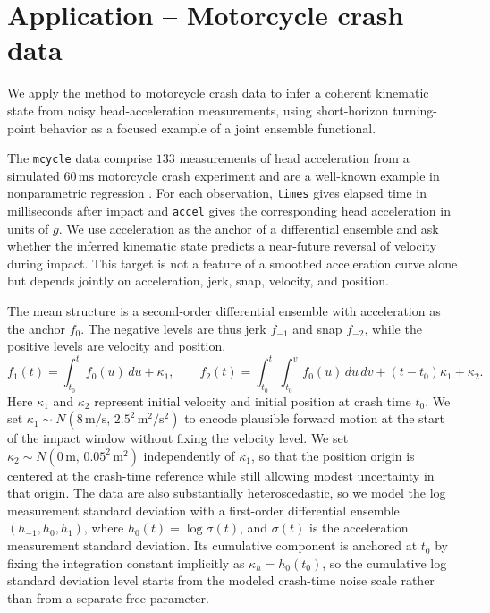 \documentclass[11pt,a4paper]{article}
\theoremstyle{definition}
\theoremstyle{remark}
\begin{document}
\section{Application -- Motorcycle crash data}\label{sec:data}

We apply the method to motorcycle crash data to infer a coherent kinematic state from noisy head-acceleration measurements, using short-horizon turning-point behavior as a focused example of a joint ensemble functional.

The \texttt{mcycle} data comprise $133$ measurements of head acceleration from a simulated $60\,\mathrm{ms}$ motorcycle crash experiment and are a well-known example in nonparametric regression \citep{silverman1985spline,desouza2014switching}. For each observation, \texttt{times} gives elapsed time in milliseconds after impact and \texttt{accel} gives the corresponding head acceleration in units of \(g\). We use acceleration as the anchor of a differential ensemble and ask whether the inferred kinematic state predicts a near-future reversal of velocity during impact. This target is not a feature of a smoothed acceleration curve alone but depends jointly on acceleration, jerk, snap, velocity, and position.

The mean structure is a second-order differential ensemble with acceleration as the anchor \(f_0\). The negative levels are thus jerk \(f_{-1}\) and snap \(f_{-2}\), while the positive levels are velocity and position,
\[
f_1(t)=\int_{t_0}^{t}f_0(u)\,du+\kappa_1,\qquad
f_2(t)=\int_{t_0}^{t}\int_{t_0}^{v}f_0(u)\,du\,dv+(t-t_0)\kappa_1+\kappa_2.
\]
Here \(\kappa_1\) and \(\kappa_2\) represent initial velocity and initial position at crash time \(t_0\). We set \(\kappa_1\sim N(8\,\mathrm{m}/\mathrm{s},\,2.5^2\,\mathrm{m}^2/\mathrm{s}^2)\) to encode plausible forward motion at the start of the impact window without fixing the velocity level. We set \(\kappa_2\sim N(0\,\mathrm{m},\,0.05^2\,\mathrm{m}^2)\) independently of \(\kappa_1\), so that the position origin is centered at the crash-time reference while still allowing modest uncertainty in that origin. The data are also substantially heteroscedastic, so we model the log measurement standard deviation with a first-order differential ensemble \((h_{-1},h_0,h_1)\), where \(h_0(t)=\log\sigma(t)\), and \(\sigma(t)\) is the acceleration measurement standard deviation. Its cumulative component is anchored at \(t_0\) by fixing the integration constant implicitly as \(\kappa_h=h_0(t_0)\), so the cumulative log standard deviation level starts from the modeled crash-time noise scale rather than from a separate free parameter.
\end{document}
